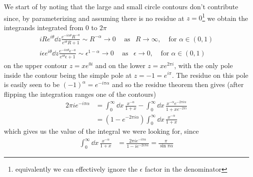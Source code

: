 \documentclass[a4paper,12pt]{article}
\begin{document}
We start of by noting that the large and small circle contours don't contribute since, by parameterizing and assuming there is no residue at $z=0$\footnote{equivalently we can effectively ignore the $\epsilon$ factor in the denominator} we obtain the integrands integrated from $0$ to $2\pi$
\begin{equation}
\begin{aligned}
	iRe^{i\theta}\dd z\frac{e^{-i\alpha\theta }R^{-a}}{e^{i\theta }R+1}\sim R^{-\alpha}\to 0~~~~\text{ as }~~R\to\infty,~~~~~\text{for }\alpha \in (0,1)\\
	i\epsilon e^{i\theta}\dd z\frac{e^{-i\alpha\theta }\epsilon^{-a}}{e^{i\theta }\epsilon+1}\sim \epsilon^{1-\alpha}\to 0~~~~\text{ as }~~\epsilon\to0,~~~~~\text{for }\alpha \in (0,1)
\end{aligned}
\end{equation}
on the upper contour $z=xe^{0i}$ and on the lower $z=xe^{2\pi i}$, with the only pole inside the contour being the simple pole at $z=-1=e^{i\pi}$. The residue on this pole is easily seen to be $(-1)^{\alpha}=e^{-i\pi \alpha}$ and so the residue theorem then gives (after flipping the integration ranges one of the contours)
\begin{equation}
\begin{aligned}
2\pi i e^{-i\pi \alpha}&=\int_{0}^{\infty}\dd x\,\frac{x^{-\alpha}}{1+x}-\int_{0}^{\infty}\dd x\,\frac{x^{-\alpha}e^{-2\pi i\alpha}}{1+xe^{-2\pi i}}\\
&=\left(1-e^{-2\pi i \alpha}\right)\int_{0}^{\infty}\dd x\,\frac{x^{-\alpha}}{1+x}
\end{aligned}
\end{equation}
which gives us the value of the integral we were looking for, since
\begin{equation}
	\begin{aligned}
		\int_{0}^{\infty}\dd x\,\frac{x^{-\alpha}}{1+x}&=\frac{2\pi ie^{-i\pi \alpha}}{1- ie^{-2i\pi \alpha}}=\frac{\pi}{\sin \pi\alpha}
	\end{aligned}
	\end{equation}
\end{document}
